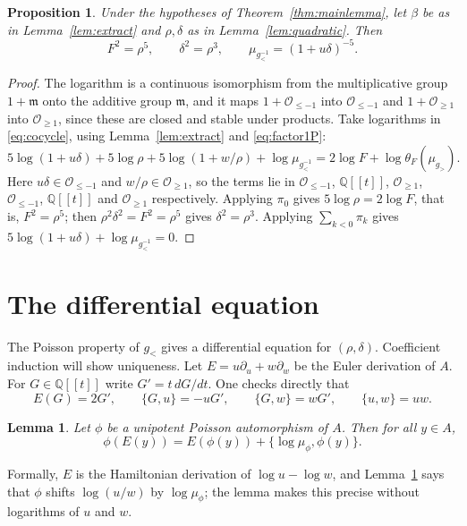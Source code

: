 \documentclass[11pt]{article}
\newtheorem{lemma}[theorem]{Lemma}
\newtheorem{proposition}[theorem]{Proposition}
\theoremstyle{definition}
\theoremstyle{remark}
\numberwithin{equation}{section}
\newcommand{\Q}{\mathbb{Q}}
\newcommand{\ps}[1]{\Q[\![#1]\!]}
\newcommand{\m}{\mathfrak{m}}
\newcommand{\Oge}[1]{\mathcal{O}_{\geq #1}}
\newcommand{\Ole}[1]{\mathcal{O}_{\leq #1}}
\newcommand{\gl}{g_{<}}
\newcommand{\gr}{g_{>}}
\begin{document}
\begin{proposition}\label{prop:E}
Under the hypotheses of Theorem~\ref{thm:mainlemma}, let $\beta$ be as in
Lemma~\ref{lem:extract} and $\rho,\delta$ as in Lemma~\ref{lem:quadratic}.
Then
\[
  F^2=\rho^5,\qquad \delta^2=\rho^3,\qquad \mu_{\gl^{-1}}=(1+u\delta)^{-5}.
\]
\end{proposition}

\begin{proof}
The logarithm is a continuous isomorphism from the multiplicative group
$1+\m$ onto the additive group $\m$, and it maps $1+\Ole{-1}$ into
$\Ole{-1}$ and $1+\Oge1$ into $\Oge1$, since these are closed and
stable under products. Take logarithms in \eqref{eq:cocycle}, using
Lemma~\ref{lem:extract} and \eqref{eq:factor1P}:
\[
  5\log(1+u\delta)+5\log\rho+5\log(1+w/\rho)+\log\mu_{\gl^{-1}}
  =2\log F+\log\theta_F(\mu_{\gr}).
\]
Here $u\delta\in\Ole{-1}$ and $w/\rho\in\Oge1$, so the terms lie in
$\Ole{-1}$, $\ps{t}$, $\Oge1$, $\Ole{-1}$, $\ps{t}$ and $\Oge1$
respectively. Applying $\pi_0$ gives $5\log\rho=2\log F$, that is,
$F^2=\rho^5$; then $\rho^2\delta^2=F^2=\rho^5$ gives $\delta^2=\rho^3$.
Applying $\sum_{k<0}\pi_k$ gives $5\log(1+u\delta)+\log\mu_{\gl^{-1}}=0$.
\end{proof}

\section{The differential equation}\label{sec:string}

The Poisson property of $\gl$ gives a differential equation for
$(\rho,\delta)$. Coefficient induction will show uniqueness. Let $E=u\partial_u+w\partial_w$ be the Euler derivation of $A$.
For $G\in\ps{t}$ write $G'=t\,dG/dt$. One checks directly that
\begin{equation}\label{eq:rules}
  E(G)=2G',\qquad \{G,u\}=-uG',\qquad \{G,w\}=wG',\qquad \{u,w\}=uw .
\end{equation}

\begin{lemma}\label{lem:euler}
Let $\phi$ be a unipotent Poisson automorphism of $A$. Then for all
$y\in A$,
\[
  \phi(E(y))=E(\phi(y))+\{\log\mu_\phi,\phi(y)\}.
\]
\end{lemma}



Formally, $E$ is the Hamiltonian derivation of $\log u-\log w$, and
Lemma~\ref{lem:euler} says that $\phi$ shifts $\log(u/w)$ by
$\log\mu_\phi$; the lemma makes this precise without logarithms of $u$
and $w$.
\end{document}
